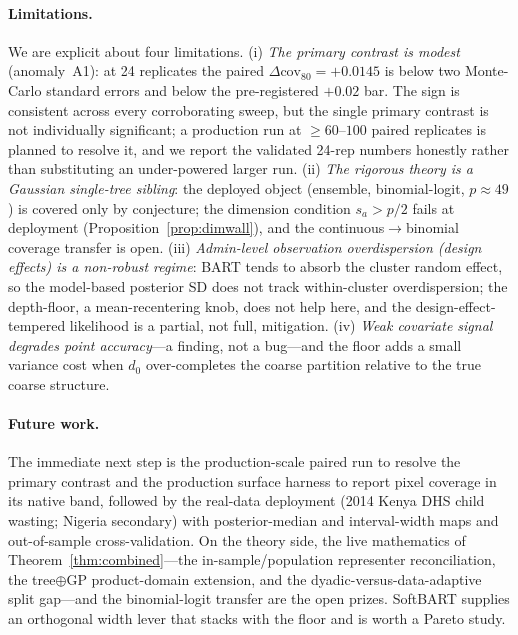 \documentclass[11pt]{article}
\theoremstyle{remark}
\newcommand{\dz}{d_0}
\newcommand{\cov}{\mathrm{cov}}
\begin{document}
\paragraph{Limitations.}
{\sloppy
We are explicit about four limitations. (i) \emph{The primary contrast is modest}
(anomaly~A1): at 24 replicates the paired $\Delta\cov_{80}=+0.0145$ is below two
Monte-Carlo standard errors and below the pre-registered $+0.02$ bar. The sign is
consistent across every corroborating sweep, but the single primary contrast is
not individually significant; a production run at $\ge60$--$100$ paired replicates
is planned to resolve it, and we report the validated 24-rep numbers honestly
rather than substituting an under-powered larger run. (ii) \emph{The rigorous
theory is a Gaussian single-tree sibling}: the deployed object (ensemble,
binomial-logit, $p\approx49$) is covered only by conjecture; the dimension
condition $s_a>p/2$ fails at deployment (Proposition~\ref{prop:dimwall}), and the
continuous$\to$binomial coverage transfer is open. (iii) \emph{Admin-level
observation overdispersion (design effects) is a non-robust regime}: BART tends to
absorb the cluster random effect, so the model-based posterior SD does not track
within-cluster overdispersion; the depth-floor, a mean-recentering knob, does not
help here, and the design-effect-tempered likelihood is a partial, not full,
mitigation. (iv) \emph{Weak covariate signal degrades point accuracy}---a finding,
not a bug---and the floor adds a small variance cost when $\dz$ over-completes the
coarse partition relative to the true coarse structure.\par}

\paragraph{Future work.}
The immediate next step is the production-scale paired run to resolve the primary
contrast and the production surface harness to report pixel coverage in its native
band, followed by the real-data deployment (2014 Kenya DHS child wasting; Nigeria
secondary) with posterior-median and interval-width maps and out-of-sample
cross-validation. On the theory side, the live mathematics of
Theorem~\ref{thm:combined}---the in-sample/population representer reconciliation,
the tree$\oplus$GP product-domain extension, and the dyadic-versus-data-adaptive
split gap---and the binomial-logit transfer are the open prizes. SoftBART supplies
an orthogonal width lever that stacks with the floor and is worth a Pareto study.
\end{document}
